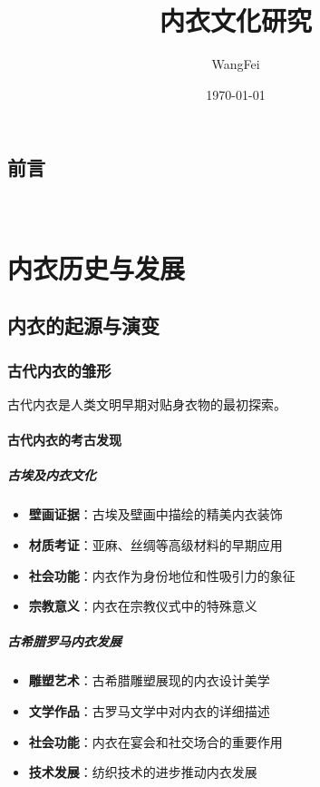 \documentclass[12pt,UTF8]{ctexbook}
\title{\heiti\zihao{0} 内衣文化研究}
\author{WangFei}
\date{\today}
\begin{document}
\maketitle
\tableofcontents

\frontmatter
\chapter{前言}

\mainmatter

~\\

\newcommand{\khfk}{\raisebox{0.8ex}{\framebox[0.6em][c]{}}}

\newcommand{\khfks}[1]{%
  \ifnum#1>0%
    \khfk%
    \ifnum#1>1\,\fi%
    \khfks{\numexpr#1-1\relax}%
  \fi%
}

\part{内衣历史与发展}

\chapter{内衣的起源与演变}
\section{古代内衣的雏形}
古代内衣是人类文明早期对贴身衣物的最初探索。

\subsection{古代内衣的考古发现}
\subsubsection{古埃及内衣文化}
\begin{itemize}[leftmargin=2cm]
	\item \textbf{壁画证据}：古埃及壁画中描绘的精美内衣装饰
	\item \textbf{材质考证}：亚麻、丝绸等高级材料的早期应用
	\item \textbf{社会功能}：内衣作为身份地位和性吸引力的象征
	\item \textbf{宗教意义}：内衣在宗教仪式中的特殊意义
\end{itemize}

\subsubsection{古希腊罗马内衣发展}
\begin{itemize}[leftmargin=2cm]
	\item \textbf{雕塑艺术}：古希腊雕塑展现的内衣设计美学
	\item \textbf{文学作品}：古罗马文学中对内衣的详细描述
	\item \textbf{社会功能}：内衣在宴会和社交场合的重要作用
	\item \textbf{技术发展}：纺织技术的进步推动内衣发展
\end{itemize}
\end{document}
